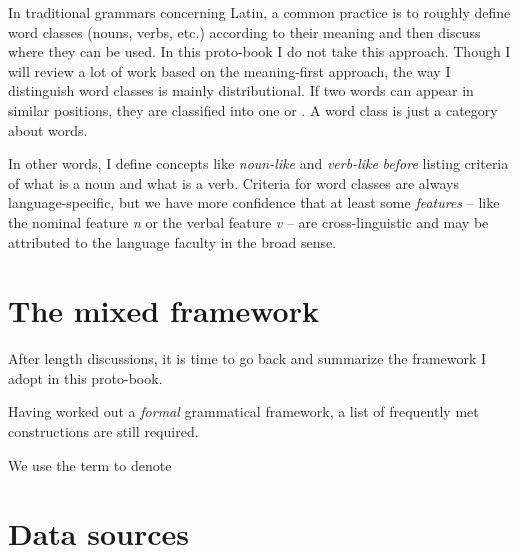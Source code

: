 \documentclass[../main.tex]{subfiles}
\begin{document}
In traditional grammars concerning Latin, a common practice is to roughly define word classes (nouns, verbs, etc.) 
according to their meaning and then discuss where they can be used. 
In this proto-book I do not take this approach. Though I will review a lot of work based on the meaning-first 
approach, the way I distinguish word classes is mainly distributional. If two words can appear in similar
positions, they are classified into one  or .
A word class is just a category about words.  

In other words, I define concepts like \emph{noun-like} and \emph{verb-like} \emph{before} listing criteria of 
what is a noun and what is a verb. Criteria for word classes are always language-specific, but we have more 
confidence that at least some \emph{features} -- like the nominal feature \textit{n} or the verbal feature 
\textit{v} -- are cross-linguistic and may be attributed to the language faculty in the broad sense. 

\section{The mixed framework}


After length discussions, it is time to go back and summarize the framework I adopt in this proto-book.

Having worked out a \emph{formal} grammatical framework, a list of frequently met constructions 
are still required. 


We use the term  to denote %

\section{Data sources}

\end{document}
